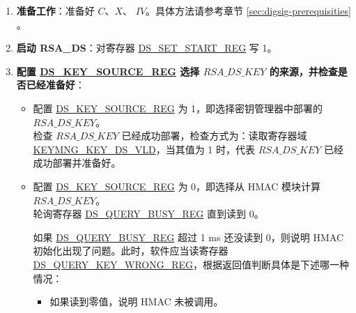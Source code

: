 \documentclass[main\_\_CN.tex]{subfiles}
\begin{document}
\begin{enumerate}

    \item {\bfseries 准备工作}：准备好 \begin{math}C\end{math}、\begin{math}X\end{math}、 \begin{math}IV\end{math}。具体方法请参考章节 \ref{sec:digsig-prerequisities} 。

    \item {\bfseries 启动 RSA\_DS}：对寄存器 \hyperref[regdesc:DSSETSTARTREG]{DS\_SET\_START\_REG} 写 1。

    \item {\bfseries 配置 \hyperref[regdesc:DSKEYSOURCEREG]{DS\_KEY\_SOURCE\_REG} 选择 \begin{math}RSA\_DS\_KEY\end{math} 的来源，并检查是否已经准备好}：
    \begin{itemize}
        \item 配置 \hyperref[regdesc:DSKEYSOURCEREG]{DS\_KEY\_SOURCE\_REG} 为 1，即选择密钥管理器中部署的 \begin{math}RSA\_DS\_KEY\end{math}。\\
        检查 \begin{math}RSA\_DS\_KEY\end{math} 已经成功部署，检查方式为：读取寄存器域 \hyperref[fielddesc:KEYMNGKEYDSVLD]{KEYMNG\_KEY\_DS\_VLD}，当其值为 1 时，代表 \begin{math}RSA\_DS\_KEY\end{math} 已经成功部署并准备好。
        \item 配置 \hyperref[regdesc:DSKEYSOURCEREG]{DS\_KEY\_SOURCE\_REG} 为 0，即选择从 HMAC 模块计算 \begin{math}RSA\_DS\_KEY\end{math}。\\
        轮询寄存器 \hyperref[regdesc:DSQUERYBUSYREG]{DS\_QUERY\_BUSY\_REG} 直到读到 0。

        如果 \hyperref[regdesc:DSQUERYBUSYREG]{DS\_QUERY\_BUSY\_REG} 超过 1 ms 还没读到 0，则说明 HMAC 初始化出现了问题。此时，软件应当读寄存器 \hyperref[regdesc:DSQUERYKEYWRONGREG]{DS\_QUERY\_KEY\_WRONG\_REG}，根据返回值判断具体是下述哪一种情况：
        \begin{itemize}

            \item 如果读到零值，说明 HMAC 未被调用。


\end{itemize}
\end{itemize}
\end{enumerate}
\end{document}

